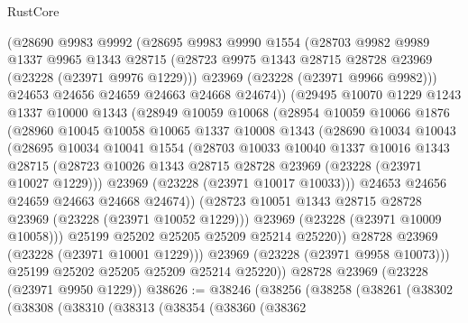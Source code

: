 \begin{lexlean}{RustCore}
\begin{coremodule}
          (@28690
            @9983
            @9992
            (@28695
              @9983
              @9990
              @1554
              (@28703
                @9982
                @9989
                @1337
                @9965
                @1343
                @28715
                (@28723 @9975 @1343 @28715 @28728 @23969 (@23228 (@23971 @9976 @1229)))
                @23969
                (@23228 (@23971 @9966 @9982)))
              @24653
              @24656
              @24659
              @24663
              @24668
              @24674))
          (@29495
            @10070
            @1229
            @1243
            @1337
            @10000
            @1343
            (@28949
              @10059
              @10068
              (@28954
                @10059
                @10066
                @1876
                (@28960
                  @10045
                  @10058
                  @10065
                  @1337
                  @10008
                  @1343
                  (@28690
                    @10034
                    @10043
                    (@28695
                      @10034
                      @10041
                      @1554
                      (@28703
                        @10033
                        @10040
                        @1337
                        @10016
                        @1343
                        @28715
                        (@28723 @10026 @1343 @28715 @28728 @23969 (@23228 (@23971 @10027 @1229)))
                        @23969
                        (@23228 (@23971 @10017 @10033)))
                      @24653
                      @24656
                      @24659
                      @24663
                      @24668
                      @24674))
                  (@28723 @10051 @1343 @28715 @28728 @23969 (@23228 (@23971 @10052 @1229)))
                  @23969
                  (@23228 (@23971 @10009 @10058)))
                @25199
                @25202
                @25205
                @25209
                @25214
                @25220))
            @28728
            @23969
            (@23228 (@23971 @10001 @1229)))
          @23969
          (@23228 (@23971 @9958 @10073)))
        @25199
        @25202
        @25205
        @25209
        @25214
        @25220))
    @28728
    @23969
    (@23228 (@23971 @9950 @1229))
@38626 := @38246
    (@38256
      (@38258
        (@38261
          (@38302
            (@38308
              (@38310
                (@38313
                  (@38354
                    (@38360
                      (@38362

\end{coremodule}
\end{lexlean}
